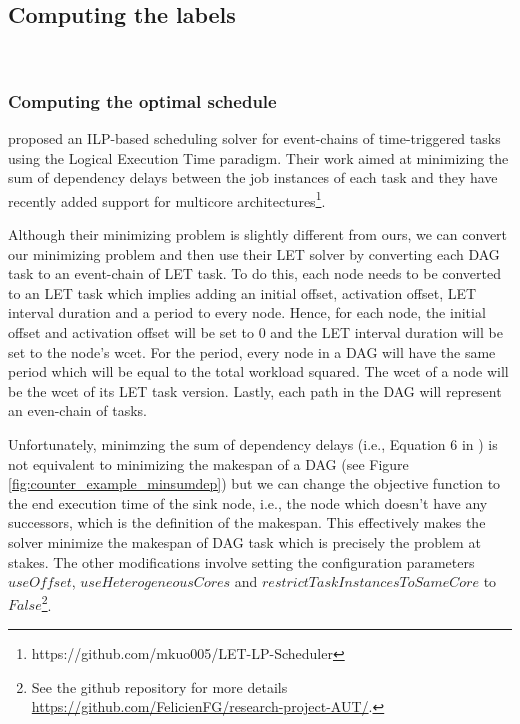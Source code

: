 \subsection{Computing the labels}
~

\subsubsection{Computing the optimal schedule}

\citet{yip2023letsynchronise} proposed an ILP-based
scheduling solver for event-chains of time-triggered tasks
using the Logical Execution Time paradigm\cite{kirsch2012logical}.
Their work aimed at minimizing the sum of dependency delays 
between the job instances of each task and they have recently added
support for multicore architectures\footnote{https://github.com/mkuo005/LET-LP-Scheduler}.

Although their minimizing problem is slightly different from ours, 
we can convert our minimizing problem and then use their LET solver by converting each DAG task 
to an event-chain of LET task.
To do this, each node needs to be converted to an LET task which 
implies adding an initial offset, activation offset, LET interval duration and a period
to every node.
Hence, for each node, the initial offset and activation offset will
be set to 0 and the LET interval duration will be set to the node's wcet.
For the period, every node in a DAG will have the same period which will
be equal to the total workload squared.
The wcet of a node will be the wcet of its LET task version.
Lastly, each path in the DAG will represent an even-chain of tasks.

Unfortunately, minimzing the sum of dependency delays (i.e., Equation 6 in \citet{yip2023letsynchronise}) is not equivalent
to minimizing the makespan of a DAG (see Figure \ref{fig:counter_example_minsumdep})
but we can change the objective function to the end execution time
of the sink node, i.e., the node which doesn't have any successors,
which is the definition of the makespan.
This effectively makes the solver minimize the makespan of DAG task
which is precisely the problem at stakes.
The other modifications involve setting the configuration parameters $useOffset$,
$useHeterogeneousCores$ and $restrictTaskInstancesToSameCore$ to
$False$\footnote{See the github repository for more details \url{https://github.com/FelicienFG/research-project-AUT/}.}.

